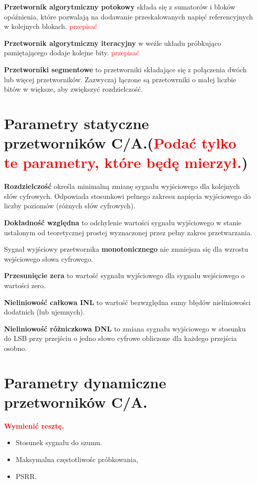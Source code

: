 \documentclass[10pt,a4paper]{report}
\begin{document}
	{	\textbf{Przetwornik algorytmiczny potokowy} składa się z sumatorów i bloków opóźnienia, które pozwalają na dodawanie przeskalowanych napięć referencyjnych w kolejnych blokach. \textcolor{red}{przepisać} }

	{	\textbf{Przetwornik algorytmiczny iteracyjny} w weźle układu próbkująco pamiętającego dodaje kolejne bity. \textcolor{red}{przepisać} }

	{ 	\textbf{Przetworniki segmentowe} to przetworniki składające się z połączenia dwóch lub więcej przetworników. Zazwyczaj łączone są przetowrniki o małej liczbie bitów w większe, aby zwiększyć rozdzielczość. }

	\section{Parametry statyczne przetworników C/A.(\textcolor{red}{Podać tylko te parametry, które będę mierzył.})}
	{	\textbf{Rozdzielczość} określa minimalną zmianę sygnału wyjściowego dla kolejnych słów cyfrowych. Odpowiada stosunkowi pełnego zakresu napięcia wyjściowego do liczby poziomów (różnych słów cyfrowych).
	}

	{	\textbf{Dokładność względna} to odchylenie wartości sygnału wyjściowego w stanie ustalonym od teoretycznej prostej wyznaczonej przez pełny zakres przetwarzania. }

	{	Sygnał wyjściowy przetwornika \textbf{monotonicznego} nie zmniejsza się dla wzrostu wejściowego słowa cyfrowego. }

	{	\textbf{Przesunięcie zera} to wartość sygnału wyjściowego dla sygnału wejściowego o wartości zero. }

	{ 	\textbf{Nieliniowość całkowa INL} to wartość bezwzględna sumy błędów nieliniowości dodatnich (lub ujemnych).}
	
	{ 	\textbf{Nieliniowość różniczkowa DNL} to zmiana sygnału wyjściowego w stosunku do LSB przy przejściu o jedno słowo cyfrowe obliczone dla każdego przejścia osobno. }

	\section{Parametry dynamiczne przetworników C/A.}
	{ \textbf{\textcolor{red}{Wymienić resztę.}}
	}

	{
		\begin{itemize}
			\item Stosunek sygnału do szumu.
			\item Maksymalna częstotliwośc próbkowania,
			\item PSRR.
		\end{itemize} 
	}
\end{document}
